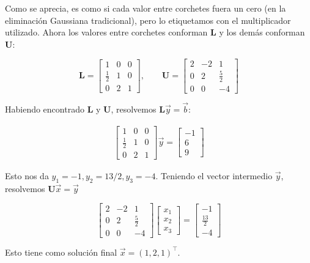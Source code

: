 \documentclass[12pt]{article}
\begin{document}
Como se aprecia, es como si cada valor entre corchetes fuera un cero (en la
eliminación Gaussiana tradicional), pero lo etiquetamos con el multiplicador
utilizado. Ahora los valores entre corchetes conforman \textbf{L} y los demás
conforman \textbf{U}:

$$\textbf{L} = \begin{bmatrix} 1 & 0 & 0 \\ \frac{1}{2} & 1 & 0 \\ 0 & 2 & 1 \end{bmatrix}, \qquad \textbf{U} = \begin{bmatrix} 2 & -2 & 1 \\ 0 & 2 & \frac{5}{2} \\ 0 & 0 & -4 \end{bmatrix}$$

Habiendo encontrado \textbf{L} y \textbf{U}, resolvemos
$\textbf{L}\overrightarrow{y} = \overrightarrow{b}$:

\begin{align*}
\begin{bmatrix} 1 & 0 & 0 \\ \frac{1}{2} & 1 & 0 \\ 0 & 2 & 1 \end{bmatrix}
\overrightarrow{y} = \begin{bmatrix} 
    -1 \\ 6 \\ 9 
\end{bmatrix} 
\end{align*}

Esto nos da $y_1 = -1, y_2 = 13 /2, y_3= -4$. Teniendo el vector intermedio
$\overrightarrow{y}$, resolvemos $\textbf{U}\overrightarrow{x} =
\overrightarrow{y}$

$$\begin{bmatrix} 2 & -2 & 1 \\ 0 & 2 & \frac{5}{2} \\ 0 & 0 & -4 \end{bmatrix} \begin{bmatrix} x_1 \\ x_2 \\ x_3 \end{bmatrix} = \begin{bmatrix} -1 \\ \frac{13}{2} \\ -4 \end{bmatrix}$$

Esto tiene como solución final $\overrightarrow{x} = (1, 2, 1)^\top$.
\end{document}
